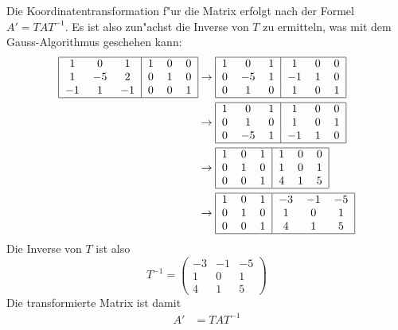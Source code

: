 \begin{loesung}
Die Koordinatentransformation f"ur die Matrix erfolgt nach der Formel $A'=TAT^{-1}$.
Es ist also zun"achst die Inverse von $T$ zu ermitteln, was mit dem Gauss-Algorithmus
geschehen kann:
\begin{align*}
\begin{tabular}{|ccc|ccc|}
\hline
   1 &  0 &  1 &1&0&0\\
   1 &$-5$&  2 &0&1&0\\
 $-1$&  1 &$-1$&0&0&1\\
\hline
\end{tabular}
&\rightarrow
\begin{tabular}{|ccc|ccc|}
\hline
   1 &  0 &  1 &  1 &0&0\\
   0 &$-5$&  1 &$-1$&1&0\\
   0 &  1 &  0 &  1 &0&1\\
\hline
\end{tabular}
\\
&\rightarrow
\begin{tabular}{|ccc|ccc|}
\hline
   1 &  0 &  1 &  1 &0&0\\
   0 &  1 &  0 &  1 &0&1\\
   0 &$-5$&  1 &$-1$&1&0\\
\hline
\end{tabular}
\\
&\rightarrow
\begin{tabular}{|ccc|ccc|}
\hline
   1 &  0 &  1 &  1 &0&0\\
   0 &  1 &  0 &  1 &0&1\\
   0 &  0 &  1 &  4 &1&5\\
\hline
\end{tabular}
\\
&\rightarrow
\begin{tabular}{|ccc|ccc|}
\hline
   1 &  0 &  1 &$-3$&$-1$&$-5$\\
   0 &  1 &  0 &  1 &  0 &  1\\
   0 &  0 &  1 &  4 &  1 &  5\\
\hline
\end{tabular}
\end{align*}
Die Inverse von $T$ ist also
\[
T^{-1}
=
\begin{pmatrix}
  -3& -1& -5\\
   1&  0&  1\\
   4&  1&  5
\end{pmatrix}
\]
Die transformierte Matrix ist damit
\begin{align*}
A'&=TAT^{-1}

\end{align*}
\end{loesung}
